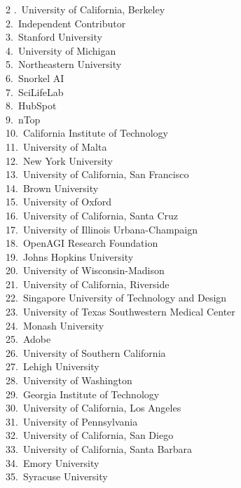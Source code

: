 {\footnotesize\raggedright
\begin{multicols}{2}
.~University of California, Berkeley \\
2.~Independent Contributor \\
3.~Stanford University \\
4.~University of Michigan \\
5.~Northeastern University \\
6.~Snorkel AI \\
7.~SciLifeLab \\
8.~HubSpot \\
9.~nTop \\
10.~California Institute of Technology \\
11.~University of Malta \\
12.~New York University \\
13.~University of California, San Francisco \\
14.~Brown University \\
15.~University of Oxford \\
16.~University of California, Santa Cruz \\
17.~University of Illinois Urbana-Champaign \\
18.~OpenAGI Research Foundation \\
19.~Johns Hopkins University \\
20.~University of Wisconsin-Madison \\
21.~University of California, Riverside \\
22.~Singapore University of Technology and Design \\
23.~University of Texas Southwestern Medical Center \\
24.~Monash University \\
25.~Adobe \\
26.~University of Southern California \\
27.~Lehigh University \\
28.~University of Washington \\
29.~Georgia Institute of Technology \\
30.~University of California, Los Angeles \\
31.~University of Pennsylvania \\
32.~University of California, San Diego \\
33.~University of California, Santa Barbara \\
34.~Emory University \\
35.~Syracuse University \\

\end{multicols}}
